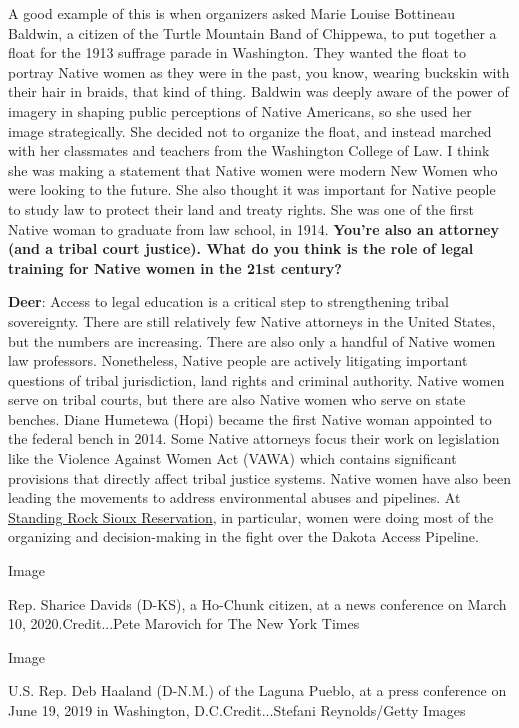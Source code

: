 A good example of this is when organizers asked Marie Louise Bottineau
Baldwin, a citizen of the Turtle Mountain Band of Chippewa, to put
together a float for the 1913 suffrage parade in Washington. They wanted
the float to portray Native women as they were in the past, you know,
wearing buckskin with their hair in braids, that kind of thing. Baldwin
was deeply aware of the power of imagery in shaping public perceptions
of Native Americans, so she used her image strategically. She decided
not to organize the float, and instead marched with her classmates and
teachers from the Washington College of Law. I think she was making a
statement that Native women were modern New Women who were looking to
the future. She also thought it was important for Native people to study
law to protect their land and treaty rights. She was one of the first
Native woman to graduate from law school, in 1914. \textbf{You're also
an attorney (and a tribal court justice). What do you think is the role
of legal training for Native women in the 21st century?}

\textbf{Deer}: Access to legal education is a critical step to
strengthening tribal sovereignty. There are still relatively few Native
attorneys in the United States, but the numbers are increasing. There
are also only a handful of Native women law professors. Nonetheless,
Native people are actively litigating important questions of tribal
jurisdiction, land rights and criminal authority. Native women serve on
tribal courts, but there are also Native women who serve on state
benches. Diane Humetewa (Hopi) became the first Native woman appointed
to the federal bench in 2014. Some Native attorneys focus their work on
legislation like the Violence Against Women Act (VAWA) which contains
significant provisions that directly affect tribal justice systems.
Native women have also been leading the movements to address
environmental abuses and pipelines. At
\href{https://www.nytimes.com/2017/01/31/magazine/the-youth-group-that-launched-a-movement-at-standing-rock.html}{Standing
Rock Sioux Reservation}, in particular, women were doing most of the
organizing and decision-making in the fight over the Dakota Access
Pipeline.

Image

Rep. Sharice Davids (D-KS), a Ho-Chunk citizen, at a news conference on
March 10, 2020.Credit...Pete Marovich for The New York Times

Image

U.S. Rep. Deb Haaland (D-N.M.) of the Laguna Pueblo, at a press
conference on June 19, 2019 in Washington, D.C.Credit...Stefani
Reynolds/Getty Images

